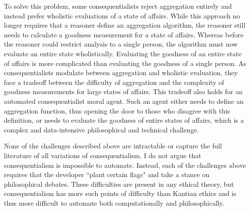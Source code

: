 \begin{isabellebody}
\begin{isamarkuptext}
To solve this problem, some consequentialists reject aggregation entirely and instead prefer wholistic
evaluations of a state of affairs. While this approach no longer requires that a reasoner define an 
aggregation algorithm, the reasoner still needs to calculate a goodness measurement for a state of 
affairs. Whereas before the reasoner could restrict analysis to a single person, the algorithm must now 
evaluate an entire state wholistically. Evaluating the goodness of an entire state of affairs is more complicated
than evaluating the goodness of a single person. As consequentialists modulate between aggregation 
and wholistic evaluation, they face a tradeoff between the difficulty of aggregation and the complexity 
of goodness measurements for large states of affairs. This tradeoff also holds for an automated
consequentialist moral agent. Such an agent either needs to define an aggregation function, thus opening 
the door to those who disagree with this definition, or needs to evaluate the goodness of entire states
of affairs, which is a complex and data-intensive philosophical and technical challenge.%
\end{isamarkuptext}\isamarkuptrue%
%
\isadelimdocument
%
\endisadelimdocument
%
\isatagdocument
%
\isamarkuptrue%
%
\endisatagdocument
{\isafolddocument}%
%
\isadelimdocument
%
\endisadelimdocument
%
\begin{isamarkuptext}%
None of the challenges described above are intractable or capture the full literature of 
all variations of consequentialism. I do not argue that consequentialism is 
impossible to automate. Instead, each of the challenges above requires that the developer 
``plant certain flags" and take a stance on philosophical debates. These difficulties are present in 
any ethical theory, but consequentialism has more such points of difficulty than Kantian ethics and 
is thus more difficult to automate both computationally and philosophically. 


\end{isamarkuptext}
\end{isabellebody}
